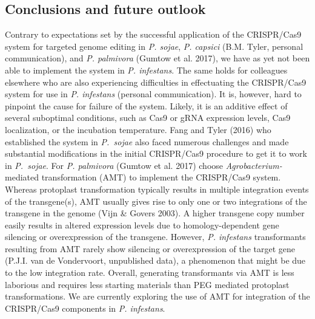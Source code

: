 \documentclass[onecolumn, 11pt,openany]{memoir}
\begin{document}
\begin{multicols}{2}
\section{Conclusions and future outlook}
Contrary to expectations set by the successful application of the CRISPR/Cas9 system for targeted genome editing in \textit{P. sojae}, \textit{P. capsici }(B.M. Tyler, personal communication), and \textit{P. palmivora }(Gumtow et al. 2017), we have as yet not been able to implement the system in \textit{P. infestans}. The same holds for colleagues elsewhere who are also experiencing difficulties in effectuating the CRISPR/Cas9 system for use in \textit{P. infestans} (personal communication). It is, however, hard to pinpoint the cause for failure of the system. Likely, it is an additive effect of several suboptimal conditions, such as Cas9 or gRNA expression levels, Cas9 localization, or the incubation temperature. Fang and Tyler (2016) who established the system in \mbox{\textit{P. sojae}} also faced numerous challenges and made substantial modifications in the initial CRISPR/Cas9 procedure to get it to work in \mbox{\textit{P. sojae}}. For \textit{P. palmivora} (Gumtow et al. 2017) choose \textit{Agrobacterium-}mediated transformation (AMT)\textit{ }to implement the CRISPR/Cas9 system. Whereas protoplast transformation typically results in multiple integration events of the transgene(s), AMT usually gives rise to only one or two integrations of the transgene in the genome (Vijn \& Govers 2003). A higher transgene copy number easily results in altered expression levels due to homology-dependent gene silencing or overexpression of the transgene.  However, \textit{P. infestans }transformants resulting from AMT rarely show silencing or overexpression of the target gene (P.J.I. van de Vondervoort, unpublished data), a phenomenon that might be due to the low integration rate. Overall, generating transformants via AMT is less laborious and requires less starting materials than PEG mediated protoplast transformations. We are currently exploring the use of AMT for integration of the CRISPR/Cas9 components in \textit{P. infestans}.


\end{multicols}
\end{document}
